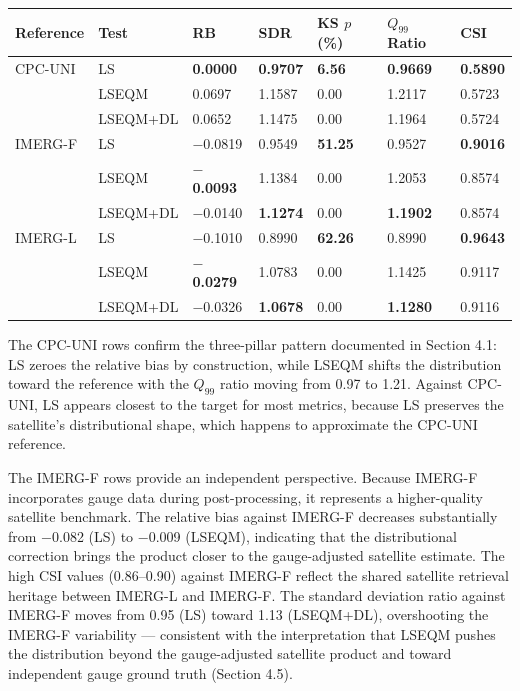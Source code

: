 \documentclass[11pt,a4paper]{article}
\begin{document}
\begingroup\small
\begin{longtable}[]{@{}lllllll@{}}
\toprule
Reference & Test & RB & SDR & KS \(p\) (\%) & \(Q_{99}\) Ratio & CSI \\
\midrule
\endhead
\bottomrule
\endlastfoot
CPC-UNI & LS & \textbf{0.0000} & \textbf{0.9707} & \textbf{6.56} &
\textbf{0.9669} & \textbf{0.5890} \\
& LSEQM & 0.0697 & 1.1587 & 0.00 & 1.2117 & 0.5723 \\
& LSEQM+DL & 0.0652 & 1.1475 & 0.00 & 1.1964 & 0.5724 \\
IMERG-F & LS & $-$0.0819 & 0.9549 & \textbf{51.25} & 0.9527 & \textbf{0.9016} \\
& LSEQM & \textbf{$-$0.0093} & 1.1384 & 0.00 & 1.2053 & 0.8574 \\
& LSEQM+DL & $-$0.0140 & \textbf{1.1274} & 0.00 & \textbf{1.1902} & 0.8574 \\
IMERG-L & LS & $-$0.1010 & 0.8990 & \textbf{62.26} & 0.8990 & \textbf{0.9643} \\
& LSEQM & \textbf{$-$0.0279} & 1.0783 & 0.00 & 1.1425 & 0.9117 \\
& LSEQM+DL & $-$0.0326 & \textbf{1.0678} & 0.00 & \textbf{1.1280} & 0.9116 \\
\end{longtable}
\endgroup

The CPC-UNI rows confirm the three-pillar pattern documented in Section
4.1: LS zeroes the relative bias by construction, while LSEQM shifts the
distribution toward the reference with the \(Q_{99}\) ratio moving from
0.97 to 1.21. Against CPC-UNI, LS appears closest to the target for most
metrics, because LS preserves the satellite's distributional shape,
which happens to approximate the CPC-UNI reference.

The IMERG-F rows provide an independent perspective. Because IMERG-F
incorporates gauge data during post-processing, it represents a
higher-quality satellite benchmark. The relative bias against IMERG-F
decreases substantially from $-$0.082 (LS) to $-$0.009 (LSEQM),
indicating that the distributional correction brings the product closer
to the gauge-adjusted satellite estimate. The high CSI values
(0.86--0.90) against IMERG-F reflect the shared satellite retrieval
heritage between IMERG-L and IMERG-F. The standard deviation ratio
against IMERG-F moves from 0.95 (LS) toward 1.13 (LSEQM+DL),
overshooting the IMERG-F variability --- consistent with the
interpretation that LSEQM pushes the distribution beyond the
gauge-adjusted satellite product and toward independent gauge ground
truth (Section 4.5).
\end{document}
